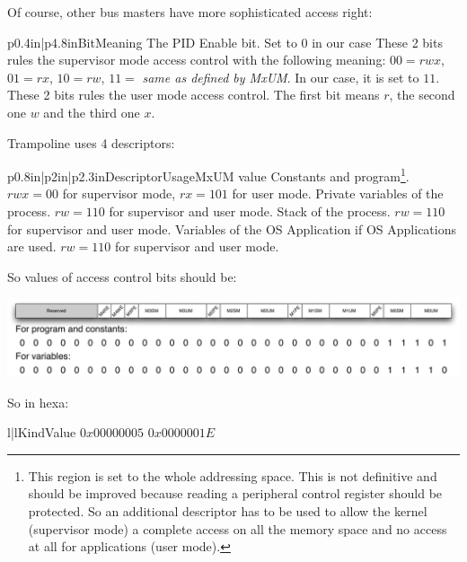 Of course, other bus masters have more sophisticated access right:

\begin{longtableii}{p{0.4in}|p{4.8in}}{}{Bit}{Meaning}
  {The PID Enable bit. Set to 0 in our case}
  {These 2 bits rules the supervisor mode access control with the following meaning: $00=rwx$, $01=rx$, $10=rw$, $11=$ {\it same as defined by MxUM}. In our case, it is set to $11$.}
  {These 2 bits rules the user mode access control. The first bit means $r$, the second one $w$ and the third one $x$.}
\end{longtableii}

Trampoline uses 4 descriptors:

\begin{longtableiii}{p{0.8in}|p{2in}|p{2.3in}}{}{Descriptor}{Usage}{MxUM value}
  {Constants and program\footnote{This region is set to the whole addressing space. This is not definitive and should be improved because reading a peripheral control register should be protected. So an additional descriptor has to be used to allow the kernel (supervisor mode) a complete access on all the memory space and no access at all for applications (user mode).}.}
  {$rwx=00$ for supervisor mode, $rx=101$ for user mode.}
  {Private variables of the process.}
  {$rw=110$ for supervisor and user mode.}
  {Stack of the process.}
  {$rw=110$ for supervisor and user mode.}
  {Variables of the OS Application if OS Applications are used.}
  {$rw=110$ for supervisor and user mode.}
\end{longtableiii}

So values of access control bits should be:

\includegraphics[width=\textwidth]{pictures/MPUprog.pdf} 

So in hexa:

\begin{longtableii}{l|l}{}{Kind}{Value}
  {$0x00000005$}
  {$0x0000001E$}
\end{longtableii}

